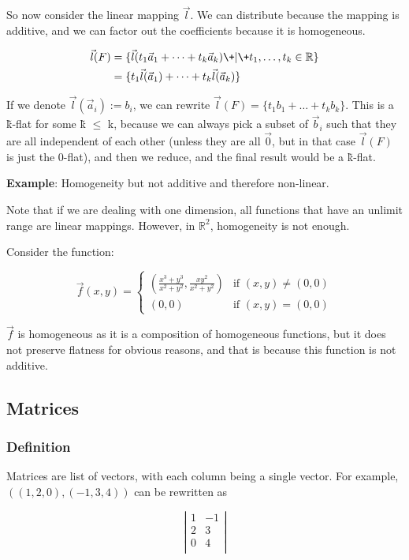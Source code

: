 \documentclass[11 pt, twoside]{article}
\begin{document}
So now consider the linear mapping $\vec{l}$. We can distribute because the
mapping is additive, and we can factor out the coefficients because it is
homogeneous.

\begin{align*}
    \vec{l}(F) &= \{\vec{l}(t_1\vec{a}_1 + \dots + t_k\vec{a}_k) \+|\+ t_1, \dots, t_k \in \mathbb{R}\}\\
               &= \{t_1 \vec{l}(\vec{a}_1) + \dots + t_k \vec{l}(\vec{a}_k)\}
\end{align*}

If we denote $\vec{l}(\vec{a}_i) := b_i$, we can rewrite $\vec{l}(F) = \{t_1
b_1 + \dots + t_k b_k\}$. This is a \~{k}-flat for some \~{k} $\leq$ k, because
we can always pick a subset of $\vec{b}_i$ such that they are all independent of
each other (unless they are all $\vec{0}$, but in that case $\vec{l}(F)$ is just
the 0-flat), and then we reduce, and the final result would be a \~{k}-flat.
\vspace{0.2cm}

\textbf{Example}: Homogeneity but not additive and therefore non-linear.

Note that if we are dealing with one dimension, all functions that have an
unlimit range are linear mappings. However, in $\mathbb{R}^2$, homogeneity is
not enough.

Consider the function:

\[
    \vec{f}(x, y) =
        \begin{cases}
            (\frac{x^3 + y^3}{x^2 + y^2}, \frac{xy^2}{x^2+y^2}) & \mbox{if } (x,
            y) \neq (0, 0)\\
            (0, 0) & \mbox{if } (x, y) = (0,0)
        \end{cases}
\]

$\vec{f}$ is homogeneous as it is a composition of homogeneous functions, but it
does not preserve flatness for obvious reasons, and that is because this
function is not additive.

\subsection{Matrices}
\subsubsection{Definition}
Matrices are list of vectors, with each column being a single vector. For
example, $((1,2,0),(-1, 3, 4))$ can be rewritten as

$$\left|\begin{array}{cc}
    1 & -1\\
    2 & 3\\
    0 & 4\\
\end{array} \right|$$
\end{document}
